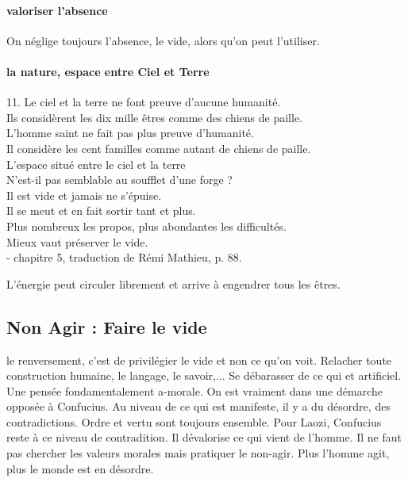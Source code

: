 \paragraph{valoriser l'absence} On néglige toujours l'absence, le vide, alors qu'on peut l'utiliser.


\paragraph{la nature, espace entre Ciel et Terre}
\begin{singlequote}
    11.	Le ciel et la terre ne font preuve d’aucune humanité.\\
Ils considèrent les dix mille êtres comme des chiens de paille. \\L’homme saint ne fait pas plus preuve d’humanité.\\
Il considère les cent familles comme autant de chiens de paille. \\L’espace situé entre le ciel et la terre\\
N’est-il pas semblable au soufflet d’une forge ? \\Il est vide et jamais ne s’épuise.\\
Il se meut et en fait sortir tant et plus.\\
Plus nombreux les propos, plus abondantes les difficultés. \\Mieux vaut préserver le vide.\\
- chapitre 5, traduction de Rémi Mathieu, p. 88.
\end{singlequote}

L'énergie peut circuler librement et arrive à engendrer tous les êtres.

\subsection{Non Agir : Faire le vide}

le renversement, c'est de privilégier le vide et non ce qu'on voit.
Relacher toute construction humaine, le langage, le savoir,... Se débarasser de ce qui et artificiel. Une pensée fondamentalement a-morale. On est vraiment dans une démarche opposée à Confucius.
Au niveau de ce qui est manifeste, il y a du désordre, des contradictions. Ordre et vertu sont toujours ensemble. Pour Laozi, Confucius reste à ce niveau de contradition. Il dévalorise ce qui vient de l'homme. Il ne faut pas chercher les valeurs morales mais pratiquer le non-agir. Plus l'homme agit, plus le monde est en désordre.


